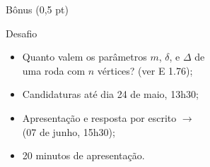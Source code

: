 \documentclass[xcolor=dvipsnames,table]{beamer}
\begin{document}
    \begin{frame}{Bônus (0,5 pt)}
		\begin{block}{Desafio}
			\begin{itemize}
				\item Quanto valem os parâmetros $m$, $\delta$, e $\Delta$ de \\uma roda com $n$ vértices? (ver E 1.76); 
                \item Candidaturas até dia 24 de maio, 13h30; 
                \item Apresentação e resposta por escrito $\rightarrow$ \\(07 de junho, 15h30); 
                \item 20 minutos de apresentação.
			\end{itemize}
		\end{block} 	
	\end{frame}
	
	\begin{frame}
		\titlepage
	\end{frame}
	
\end{document}
